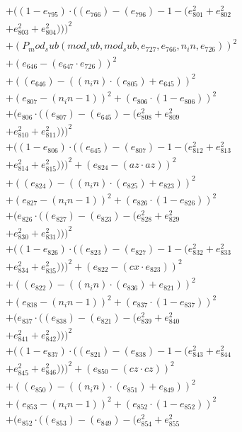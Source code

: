 \documentclass[10pt, a4paper]{article}
\begin{document}
\begin{align*}
& + ((1 - e_{795})  \cdot  ((e_{766}) - (e_{796}) - 1 - (e_{801}^{2} + e_{802}^{2} \\
& + e_{803}^{2} + e_{804}^{2})))^{2} \\
& + (P_mod_sub(mod_sub, mod_sub, e_{727}, e_{766}, n_in, e_{726}))^{2} \\
& + (e_{646} - (e_{647}  \cdot  e_{726}))^{2} \\
& + ((e_{646}) - ((n_in)  \cdot  (e_{805}) + e_{645}))^{2} \\
& + (e_{807} - (n_in - 1))^{2} + (e_{806}  \cdot  (1 - e_{806}))^{2} \\
& + (e_{806}  \cdot  ((e_{807}) - (e_{645}) - (e_{808}^{2} + e_{809}^{2} \\
& + e_{810}^{2} + e_{811}^{2})))^{2} \\
& + ((1 - e_{806})  \cdot  ((e_{645}) - (e_{807}) - 1 - (e_{812}^{2} + e_{813}^{2} \\
& + e_{814}^{2} + e_{815}^{2})))^{2} + (e_{824} - (az  \cdot  az))^{2} \\
& + ((e_{824}) - ((n_in)  \cdot  (e_{825}) + e_{823}))^{2} \\
& + (e_{827} - (n_in - 1))^{2} + (e_{826}  \cdot  (1 - e_{826}))^{2} \\
& + (e_{826}  \cdot  ((e_{827}) - (e_{823}) - (e_{828}^{2} + e_{829}^{2} \\
& + e_{830}^{2} + e_{831}^{2})))^{2} \\
& + ((1 - e_{826})  \cdot  ((e_{823}) - (e_{827}) - 1 - (e_{832}^{2} + e_{833}^{2} \\
& + e_{834}^{2} + e_{835}^{2})))^{2} + (e_{822} - (cx  \cdot  e_{823}))^{2} \\
& + ((e_{822}) - ((n_in)  \cdot  (e_{836}) + e_{821}))^{2} \\
& + (e_{838} - (n_in - 1))^{2} + (e_{837}  \cdot  (1 - e_{837}))^{2} \\
& + (e_{837}  \cdot  ((e_{838}) - (e_{821}) - (e_{839}^{2} + e_{840}^{2} \\
& + e_{841}^{2} + e_{842}^{2})))^{2} \\
& + ((1 - e_{837})  \cdot  ((e_{821}) - (e_{838}) - 1 - (e_{843}^{2} + e_{844}^{2} \\
& + e_{845}^{2} + e_{846}^{2})))^{2} + (e_{850} - (cz  \cdot  cz))^{2} \\
& + ((e_{850}) - ((n_in)  \cdot  (e_{851}) + e_{849}))^{2} \\
& + (e_{853} - (n_in - 1))^{2} + (e_{852}  \cdot  (1 - e_{852}))^{2} \\
& + (e_{852}  \cdot  ((e_{853}) - (e_{849}) - (e_{854}^{2} + e_{855}^{2} \\

\end{align*}
\end{document}
